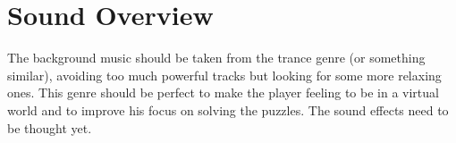 \documentclass[12pt, a4paper]{report}
\begin{document}
\chapter{Sound Overview}
The background music should be taken from the trance genre (or something similar), avoiding too much powerful tracks but looking for some more relaxing ones. This genre should be perfect to make the player feeling to be in a virtual world and to improve his focus on solving the puzzles.
The sound effects need to be thought yet.
\end{document}
